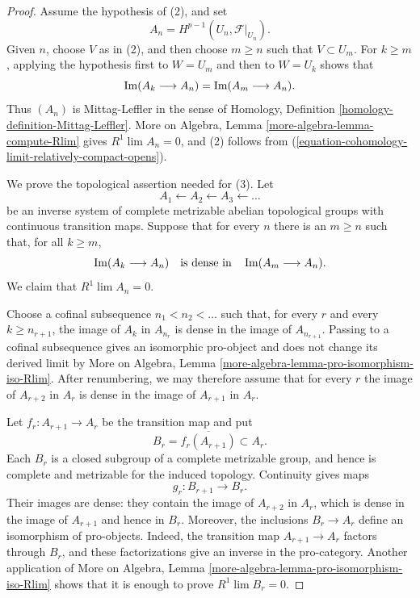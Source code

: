 \begin{proof}
Assume the hypothesis of (2), and set
$$
A_n=H^{p-1}(U_n,\mathcal{F}|_{U_n}).
$$
Given $n$, choose $V$ as in (2), and then choose $m\geq n$ such that
$V\subset U_m$. For $k\geq m$, applying the hypothesis first to
$W=U_m$ and then to $W=U_k$ shows that
$$
\mathop{\rm Im}(A_k\longrightarrow A_n)
=
\mathop{\rm Im}(A_m\longrightarrow A_n).
$$
Thus $(A_n)$ is Mittag-Leffler in the sense of Homology, Definition
\ref{homology-definition-Mittag-Leffler}. More on Algebra, Lemma
\ref{more-algebra-lemma-compute-Rlim} gives
$R^1\lim A_n=0$, and (2) follows from
(\ref{equation-cohomology-limit-relatively-compact-opens}).

We prove the topological assertion needed for (3). Let
$$
A_1\longleftarrow A_2\longleftarrow A_3\longleftarrow\ldots
$$
be an inverse system of complete metrizable abelian topological groups
with continuous transition maps. Suppose that for every $n$ there is
an $m\geq n$ such that, for all $k\geq m$,
$$
\mathop{\rm Im}(A_k\longrightarrow A_n)
\quad\text{is dense in}\quad
\mathop{\rm Im}(A_m\longrightarrow A_n).
$$
We claim that $R^1\lim A_n=0$.

Choose a cofinal subsequence
$n_1<n_2<\ldots$ such that, for every $r$ and every
$k\geq n_{r+1}$, the image of $A_k$ in $A_{n_r}$ is dense in the
image of $A_{n_{r+1}}$. Passing to a cofinal subsequence gives an
isomorphic pro-object and does not change its derived limit by More on
Algebra, Lemma
\ref{more-algebra-lemma-pro-isomorphism-iso-Rlim}. After renumbering, we
may therefore assume that for every $r$ the image of $A_{r+2}$ in $A_r$
is dense in the image of $A_{r+1}$ in $A_r$.

Let $f_r:A_{r+1}\to A_r$ be the transition map and put
$$
B_r=\overline{f_r(A_{r+1})}\subset A_r.
$$
Each $B_r$ is a closed subgroup of a complete metrizable group, and
hence is complete and metrizable for the induced topology.
Continuity gives maps
$$
g_r:B_{r+1}\longrightarrow B_r.
$$
Their images are dense: they contain the image of $A_{r+2}$ in
$A_r$, which is dense in the image of $A_{r+1}$ and hence in $B_r$.
Moreover, the inclusions $B_r\to A_r$ define an isomorphism of
pro-objects. Indeed, the transition map
$A_{r+1}\to A_r$ factors through $B_r$, and these factorizations give
an inverse in the pro-category. Another application of More on
Algebra, Lemma \ref{more-algebra-lemma-pro-isomorphism-iso-Rlim} shows
that it is enough to prove $R^1\lim B_r=0$.


\end{proof}
